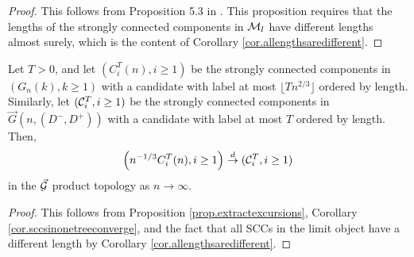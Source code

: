 \begin{proof}
This follows from Proposition 5.3 in \cite{Goldschmidt2019}. This proposition requires that the lengths of the strongly connected components in ${\mathcal M}_{l}$ have different lengths almost surely, which is the content of Corollary \ref{cor.allengthsaredifferent}. 
\end{proof}

\begin{corollary}\label{cor.sccordereduptotimeT}
Let $T>0$, and let $(C^T_i(n),i\geq 1)$ be the strongly connected components in $(G_n(k),k\geq 1)$ with a candidate with label at most $\lfloor T n^{2/3}\rfloor$ ordered by length. Similarly, let $({\mathcal C}^T_i,i\geq 1)$ be the strongly connected components in $\vec{G}(n,(D^-,D^+))$ with a candidate with label at most $T$ ordered by length. Then,
$$\left(n^{-1/3}C^T_i(n), i\geq 1\right) \overset{d}{\to} ({\mathcal C}^T_i,i\geq 1)$$
in the $\vec{{\mathcal G}}$ product topology as $n\to \infty$. 
\end{corollary}
\begin{proof}
This follows from Proposition \ref{prop.extractexcursions}, Corollary \ref{cor.sccsinonetreeconverge}, and the fact that all SCCs in the limit object have a different length by Corollary \ref{cor.allengthsaredifferent}. 
\end{proof}

